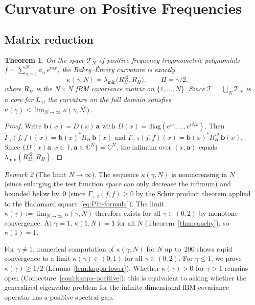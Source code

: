 \documentclass[11pt,a4paper]{article}
\theoremstyle{plain}
\newtheorem{theorem}{Theorem}[section]
\theoremstyle{definition}
\theoremstyle{remark}
\newtheorem{remark}[theorem]{Remark}
\newcommand{\C}{\mathbb{C}}
\newcommand{\T}{\mathbb{T}}
\begin{document}
\section{Curvature on Positive Frequencies}\label{sec:curvature}

\subsection{Matrix reduction}\label{sec:curv-pos}

\begin{theorem}\label{thm:curvature}
On the space $\mathcal{T}_N^+$ of positive-frequency trigonometric
polynomials $f = \sum_{n=1}^N a_n\,e^{inx}$, the Bakry--\'Emery
curvature is exactly
\begin{equation}\label{eq:kappa-def}
  \kappa(\gamma,N) = \lambda_{\min}\!\bigl(R_H^{\circ 2}, R_H\bigr),
  \qquad H = \gamma/2,
\end{equation}
where $R_H$ is the $N \times N$ fBM covariance matrix on $\{1,\ldots,N\}$.
Since $\mathcal{T} = \bigcup_N \mathcal{T}_N$ is a core for $L_\gamma$,
the curvature on the full domain satisfies
$\kappa(\gamma) \leq \lim_{N\to\infty} \kappa(\gamma,N)$.
\end{theorem}

\begin{proof}
Write $\mathbf{b}(x) = D(x)\,\mathbf{a}$ with
$D(x) = \mathrm{diag}(e^{ix},\ldots,e^{iNx})$. Then
$\widetilde{\Gamma}_\gamma(f,f)(x) = \mathbf{b}(x)^* R_H\,\mathbf{b}(x)$
and $\widetilde{\Gamma}_{\gamma,2}(f,f)(x) =
\mathbf{b}(x)^* R_H^{\circ 2}\,\mathbf{b}(x)$.
Since $\{D(x)\mathbf{a} : x \in \T, \mathbf{a} \in \C^N\} = \C^N$,
the infimum over $(x,\mathbf{a})$ equals
$\lambda_{\min}(R_H^{\circ 2}, R_H)$.
\end{proof}

\begin{remark}[The limit $N \to \infty$]
\label{rem:N-limit}
The sequence $\kappa(\gamma,N)$ is nonincreasing in $N$
(since enlarging the test function space can only decrease
the infimum) and bounded below by~$0$
(since $\Gamma_{\gamma,2}(f,f) \geq 0$ by the Schur product
theorem applied to the Hadamard square~\eqref{eq:Phi-formula}).
The limit $\kappa(\gamma) := \lim_{N\to\infty}\kappa(\gamma,N)$
therefore exists for all $\gamma \in (0,2)$ by monotone convergence.
At $\gamma = 1$, $\kappa(1,N) = 1$ for all
$N$ (Theorem~\ref{thm:cauchy}), so
$\kappa(1) = 1$.

For $\gamma \neq 1$, numerical computation of $\kappa(\gamma,N)$
for $N$ up to~$200$ shows rapid convergence to a limit
$\kappa(\gamma) \in (0,1)$ for all $\gamma \in (0,2)$.
For $\gamma \leq 1$, we prove $\kappa(\gamma) \geq 1/2$
(Lemma~\ref{lem:kappa-lower}). Whether $\kappa(\gamma) > 0$
for $\gamma > 1$ remains open
(Conjecture~\ref{conj:kappa-positive});
this is equivalent to asking
whether the generalized eigenvalue problem for the
infinite-dimensional fBM covariance operator has a positive
spectral gap.
\end{remark}
\end{document}
